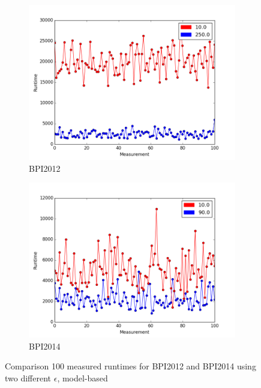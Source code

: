 \documentclass[
	a4paper,
	pagesize,
	pdftex,
	12pt,
	twoside, %
	BCOR=5mm, %
	ngerman,
	fleqn,
	final,
	]{scrartcl}
\begin{document}
\begin{figure}[h]
	\begin{subfigure}{.5\textwidth}
	  \centering
	  \includegraphics[width=.9\linewidth]{data/BPI2012/lax_10_250_runtime.png}
	  \caption{BPI2012 }
	  \label{fig:runtimeMeasurement12}
	\end{subfigure}%
	\begin{subfigure}{.5\textwidth}
	  \centering
	  \includegraphics[width=.9\linewidth]{data/BPI2014/lax_10_90_runtime.png}
	  \caption{BPI2014}
	  \label{fig:runtimeMeasurement14}
	\end{subfigure}
	\caption{Comparison 100 measured runtimes for BPI2012 and BPI2014 using two different $\epsilon$, model-based}
	\label{fig:runtimeMeasurements1214}
\end{figure}
\end{document}
